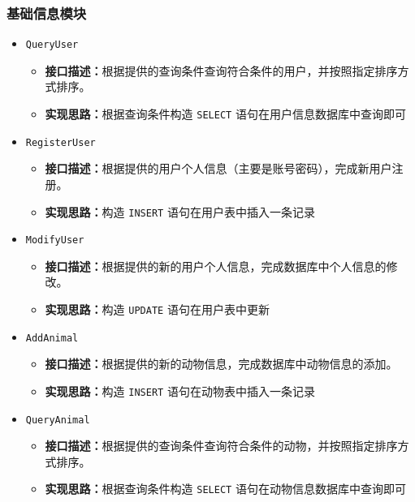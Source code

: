 \documentclass[12pt,a4paper,UTF8]{article}
\begin{document}
\subsubsection{基础信息模块}

\begin{itemize}

  \item \verb|QueryUser|
  \begin{itemize}
  \item \textbf{接口描述：}根据提供的查询条件查询符合条件的用户，并按照指定排序方式排序。
  \item \textbf{实现思路：}根据查询条件构造 \verb|SELECT| 语句在用户信息数据库中查询即可
  \end{itemize}

  \item \verb|RegisterUser|
  \begin{itemize}
  \item \textbf{接口描述：}根据提供的用户个人信息（主要是账号密码），完成新用户注册。
  \item \textbf{实现思路：}构造 \verb|INSERT| 语句在用户表中插入一条记录
  \end{itemize}

  \item \verb|ModifyUser|
  \begin{itemize}
  \item \textbf{接口描述：}根据提供的新的用户个人信息，完成数据库中个人信息的修改。
  \item \textbf{实现思路：}构造 \verb|UPDATE| 语句在用户表中更新
  \end{itemize}

  \item \verb|AddAnimal|
  \begin{itemize}
  \item \textbf{接口描述：}根据提供的新的动物信息，完成数据库中动物信息的添加。
  \item \textbf{实现思路：}构造 \verb|INSERT| 语句在动物表中插入一条记录
  \end{itemize}

  \item \verb|QueryAnimal|
  \begin{itemize}
  \item \textbf{接口描述：}根据提供的查询条件查询符合条件的动物，并按照指定排序方式排序。
  \item \textbf{实现思路：}根据查询条件构造 \verb|SELECT| 语句在动物信息数据库中查询即可
  \end{itemize}


\end{itemize}
\end{document}
